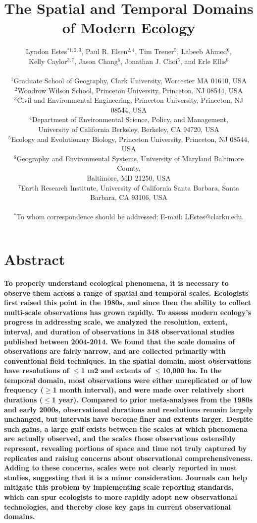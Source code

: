 \documentclass[12pt]{article}
\title{The Spatial and Temporal Domains of Modern Ecology }%
\author
{Lyndon Estes$^{\ast1, 2, 3}$, Paul R. Elsen$^{2, 4}$, Tim Treuer$^{5}$, Labeeb Ahmed$^{6}$, \\
Kelly Caylor$^{3, 7}$, Jason Chang$^{6}$, Jonathan J. Choi$^{5}$, and Erle Ellis$^{6}$ \\
\\
\normalsize{$^{1}$Graduate School of Geography, Clark University, Worcester MA 01610, USA}\\
\normalsize{$^{2}$Woodrow Wilson School, Princeton University, Princeton, NJ 08544, USA}\\
\normalsize{$^{3}$Civil and Environmental Engineering, Princeton University, Princeton, NJ 08544, USA}\\
\normalsize{$^{4}$Department of Environmental Science, Policy, and Management,}\\
\normalsize{University of California Berkeley, Berkeley, CA 94720, USA}\\
\normalsize{$^{5}$Ecology and Evolutionary Biology, Princeton University, Princeton, NJ 08544, USA}\\
\normalsize{$^{6}$Geography and Environmental Systems, University of Maryland Baltimore County,}\\ 
\normalsize{Baltimore, MD 21250, USA}\\
\normalsize{$^{7}$Earth Research Institute, University of California Santa Barbara, Santa Barbara, CA 93106, USA}\\
\\
\normalsize{$^\ast$To whom correspondence should be addressed; E-mail:  LEstes@clarku.edu.}}
\date{}
\begin{document}
 


\baselineskip24pt


\maketitle 

\section*{Abstract}
\textbf{To properly understand ecological phenomena, it is necessary to observe them across a range of spatial and temporal scales. Ecologists first raised this point in the 1980s, and since then the ability to collect multi-scale observations has grown rapidly. To assess modern ecology's progress in addressing scale, we analyzed the resolution, extent, interval, and duration of observations in 348 observational studies published between 2004-2014. We found that the scale domains of observations are fairly narrow, and are collected primarily with conventional field techniques. In the spatial domain, most observations have resolutions of $\leq$1 m2 and extents of $\leq$10,000 ha. In the temporal domain, most observations were either unreplicated or of low frequency ($\geq$1 month interval), and were made over relatively short durations ($\leq$1 year). Compared to prior meta-analyses from the 1980s and early 2000s, observational durations and resolutions remain largely unchanged, but intervals have become finer and extents larger. Despite such gains, a large gulf exists between the scales at which phenomena are actually observed, and the scales those observations ostensibly represent, revealing portions of space and time not truly captured by replicates and raising concerns about observational comprehensiveness. Adding to these concerns, scales were not clearly reported in most studies, suggesting that it is a minor consideration. Journals can help mitigate this problem by implementing scale reporting standards, which can spur ecologists to more rapidly adopt new observational technologies, and thereby close key gaps in current observational domains.} 
\end{document}
